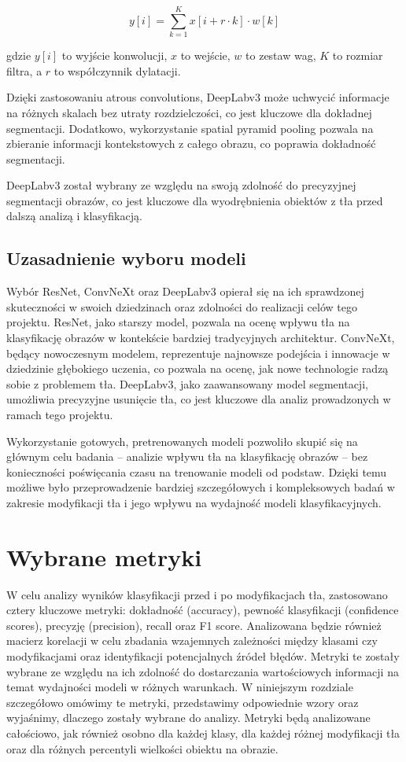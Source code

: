 \begin{equation}
y[i] = \sum_{k=1}^{K} x[i + r \cdot k] \cdot w[k]
\end{equation}

gdzie \( y[i] \) to wyjście konwolucji, \( x \) to wejście, \( w \) to zestaw wag, \( K \) to rozmiar filtra, a \( r \) 
to współczynnik dylatacji.

Dzięki zastosowaniu atrous convolutions, DeepLabv3 może uchwycić informacje na różnych skalach bez utraty 
rozdzielczości, co jest kluczowe dla dokładnej segmentacji. Dodatkowo, wykorzystanie spatial pyramid pooling pozwala na 
zbieranie informacji kontekstowych z całego obrazu, co poprawia dokładność segmentacji.

DeepLabv3 został wybrany ze względu na swoją zdolność do precyzyjnej segmentacji obrazów, co jest kluczowe dla 
wyodrębnienia obiektów z tła przed dalszą analizą i klasyfikacją.

\subsection*{Uzasadnienie wyboru modeli}

Wybór ResNet, ConvNeXt oraz DeepLabv3 opierał się na ich sprawdzonej skuteczności w swoich dziedzinach oraz zdolności 
do realizacji celów tego projektu. ResNet, jako starszy model, pozwala na ocenę wpływu tła na klasyfikację obrazów w 
kontekście bardziej tradycyjnych architektur. ConvNeXt, będący nowoczesnym modelem, reprezentuje najnowsze podejścia i 
innowacje w dziedzinie głębokiego uczenia, co pozwala na ocenę, jak nowe technologie radzą sobie z problemem tła. 
DeepLabv3, jako zaawansowany model segmentacji, umożliwia precyzyjne usunięcie tła, co jest kluczowe dla analiz 
prowadzonych w ramach tego projektu.

Wykorzystanie gotowych, pretrenowanych modeli pozwoliło skupić się na głównym celu badania – analizie wpływu tła na 
klasyfikację obrazów – bez konieczności poświęcania czasu na trenowanie modeli od podstaw. Dzięki temu możliwe było 
przeprowadzenie bardziej szczegółowych i kompleksowych badań w zakresie modyfikacji tła i jego wpływu na wydajność 
modeli klasyfikacyjnych.

\section*{Wybrane metryki}

W celu analizy wyników klasyfikacji przed i po modyfikacjach tła, zastosowano cztery kluczowe 
metryki: dokładność (accuracy), pewność klasyfikacji (confidence scores), precyzję (precision), 
recall oraz F1 score. Analizowana będzie również macierz korelacji w celu zbadania wzajemnych 
zależności między klasami czy modyfikacjami oraz identyfikacji potencjalnych źródeł błędów. Metryki te zostały wybrane 
ze względu na ich zdolność do dostarczania wartościowych informacji na temat wydajności modeli w 
różnych warunkach. W niniejszym rozdziale szczegółowo omówimy te metryki, przedstawimy odpowiednie 
wzory oraz wyjaśnimy, dlaczego zostały wybrane do analizy. Metryki będą analizowane całościowo, jak 
również osobno dla każdej klasy, dla każdej różnej modyfikacji tła oraz dla różnych percentyli 
wielkości obiektu na obrazie.


